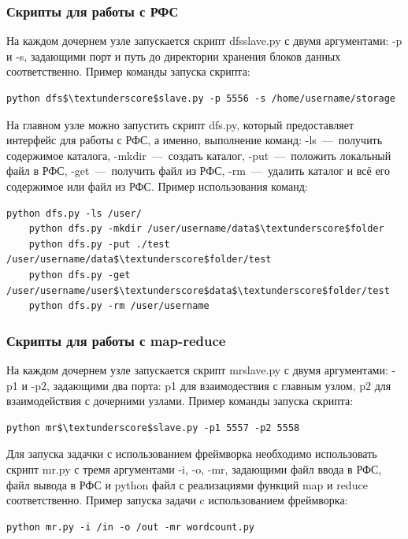 \documentclass[12pt,a4paper,oneside]{extarticle}
\begin{document}
        \subsubsection{Скрипты для работы с РФС}
            На каждом дочернем узле запускается скрипт dfs\textunderscore slave.py с двумя аргументами: -p и -s, задающими порт и путь до директории хранения блоков данных соответственно.
            Пример команды запуска скрипта:
            \lstset{language=C}
            \begin{lstlisting}[mathescape] 
    python dfs$\textunderscore$slave.py -p 5556 -s /home/username/storage
            \end{lstlisting}
            
            На главном узле можно запустить скрипт dfs.py, который предоставляет интерфейс для работы с РФС, а именно, выполнение команд: -ls~---~получить содержимое каталога, -mkdir~---~создать каталог, -put~---~положить локальный файл в РФС, -get~---~получить файл из РФС, -rm~---~удалить каталог и всё его содержимое или файл из РФС.
            Пример использования команд:
            \lstset{}
            \begin{lstlisting}[mathescape]
    python dfs.py -ls /user/
    python dfs.py -mkdir /user/username/data$\textunderscore$folder
    python dfs.py -put ./test /user/username/data$\textunderscore$folder/test
    python dfs.py -get /user/username/user$\textunderscore$data$\textunderscore$folder/test
    python dfs.py -rm /user/username
            \end{lstlisting}

        \subsubsection{Скрипты для работы с map-reduce}
            На каждом дочернем узле запускается скрипт mr\textunderscore slave.py с двумя аргументами: -p1 и -p2, задающими два порта: p1 для взаимодествия с главным узлом, p2 для взаимодействия с дочерними узлами.
            Пример команды запуска скрипта:
            \lstset{}
            \begin{lstlisting}[mathescape] 
    python mr$\textunderscore$slave.py -p1 5557 -p2 5558
            \end{lstlisting}

            Для запуска задачки с использованием фреймворка необходимо использовать скрипт mr.py с тремя аргументами -i, -o, -mr, задающими файл ввода в РФС, файл вывода в РФС и python файл с реализациями функций map и reduce соответственно.
            Пример запуска задачи c использованием фреймворка:
            \lstset{}
            \begin{lstlisting}[mathescape] 
    python mr.py -i /in -o /out -mr wordcount.py
            \end{lstlisting}
\end{document}
